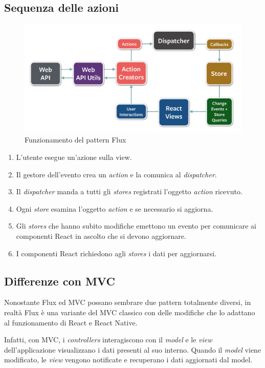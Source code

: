 \subsection{Sequenza delle azioni}

\begin{figure}[htp]
\centering
\includegraphics[width=\textwidth*3/4]{../immagini/flux-diagram}
\caption{Funzionamento del pattern Flux}  
\end{figure}
\FloatBarrier

\begin{enumerate}
\item L'utente esegue un'azione sulla view.
\item Il gestore dell'evento crea un \textit{action} e la comunica al \textit{dispatcher}.
\item Il \textit{dispatcher} manda a tutti gli \textit{stores} registrati l'oggetto \textit{action} ricevuto.
\item Ogni \textit{store} esamina l'oggetto  \textit{action} e se necessario si aggiorna. 
\item Gli \textit{stores} che hanno subito modifiche emettono un evento per comunicare ai componenti React in ascolto che si devono aggiornare.
\item I componenti React richiedono agli \textit{stores} i dati per aggiornarsi.
\end{enumerate}

\subsection{Differenze con MVC}

Nonostante Flux ed MVC possano sembrare due pattern totalmente diversi, in realtà Flux è una variante del MVC classico con delle modifiche che lo adattano al funzionamento di React e React Native.

Infatti, con MVC, i \textit{controllers} interagiscono con il \textit{model} e le \textit{view} dell'applicazione visualizzano i dati presenti al suo interno.
Quando il \textit{model} viene modificato, le \textit{view} vengono notificate e recuperano i dati aggiornati dal model.

